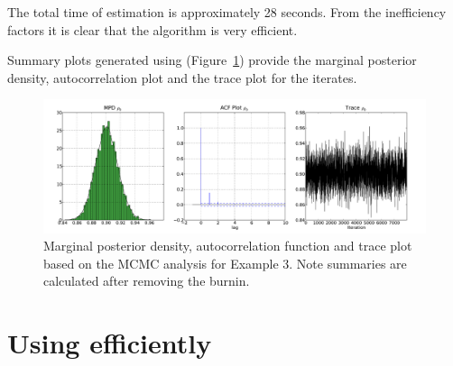 \documentclass[article]{jss}
\begin{document}
The total time of estimation is approximately 28 seconds. From the
inefficiency factors it is clear that the algorithm is very efficient.

Summary plots generated using 
(Figure~\ref{Flo:AR1}) provide the marginal posterior density,
autocorrelation plot and the trace plot for the iterates.


%
\begin{figure}[t!]
\begin{center}
  \includegraphics{rho.pdf}
\end{center}
\caption{Marginal posterior density, autocorrelation function and
  trace plot based on the MCMC analysis for Example 3. Note summaries
  are calculated after removing the burnin.}
\label{Flo:AR1}
\end{figure}


\section[Using PyMCMC  efficiently]{Using   efficiently}
\label{sec:Using-PyMCMC-efficiently}
\end{document}
